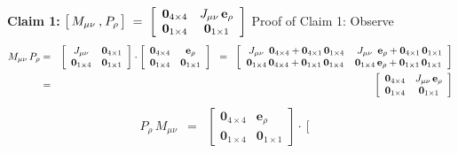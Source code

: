 \begin{enumerate}
	\vskip 0.3cm
	\noindent
	\textbf{Claim 1:}\quad
	$
	\left[\,
		M_{\mu\nu}
		\,\overset{{\color{white}1}}{,}\,
		P_{\rho}
		\,\right]
	\; = \;
		\left[\begin{array}{cc}
			\mathbf{0}_{4 \times 4} & J_{\mu\nu}\,\mathbf{e}_{\rho}
			\\
			\mathbf{0}_{1 \times 4} & \mathbf{0}_{1 \times 1}
			\end{array}\right]
	$
	\vskip 0.1cm
	\noindent
	Proof of Claim 1:\;\;
	Observe
	\begin{eqnarray*}
	M_{\mu\nu}\,P_{\rho}
	& = &
		\left[\begin{array}{cc}
			J_{\mu\nu} & \mathbf{0}_{4 \times 1}
			\\
			\mathbf{0}_{1 \times 4} & \mathbf{0}_{1 \times 1}
			\end{array}\right]
		\cdot
		\left[\begin{array}{cc}
			\mathbf{0}_{4 \times 4} & \mathbf{e}_{\rho}
			\\
			\mathbf{0}_{1 \times 4} & \mathbf{0}_{1 \times 1}
			\end{array}\right]
		\;\; = \;\;
		\left[\begin{array}{cc}
			{\color{white}.}J_{\mu\nu}{\color{white}1}\mathbf{0}_{4 \times 4} + \mathbf{0}_{4 \times 1}\,\mathbf{0}_{1 \times 4}
			&
			{\color{white}.}J_{\mu\nu}{\color{white}1}\mathbf{e}_{\rho} + \mathbf{0}_{4 \times 1}\,\mathbf{0}_{1 \times 1}
			\\
			\mathbf{0}_{1 \times 4}\,\mathbf{0}_{4 \times 4} + \mathbf{0}_{1 \times 1}\,\mathbf{0}_{1 \times 4}
			&
			\mathbf{0}_{1 \times 4}\,\mathbf{e}_{\rho} + \mathbf{0}_{1 \times 1}\,\mathbf{0}_{1 \times 1}
			\end{array}\right]
	\\
	& = &
		\left[\begin{array}{cc}
			\mathbf{0}_{4 \times 4} & J_{\mu\nu}\,\mathbf{e}_{\rho}
			\\
			\mathbf{0}_{1 \times 4} & \mathbf{0}_{1 \times 1}
			\end{array}\right]
	\end{eqnarray*}
	\begin{eqnarray*}
	P_{\rho}\,M_{\mu\nu}
	& = &
		\left[\begin{array}{cc}
			\mathbf{0}_{4 \times 4} & \mathbf{e}_{\rho}
			\\
			\mathbf{0}_{1 \times 4} & \mathbf{0}_{1 \times 1}
			\end{array}\right]
		\cdot
		\left[\begin{array}{cc}

\end{array}
\end{eqnarray*}
\end{enumerate}
